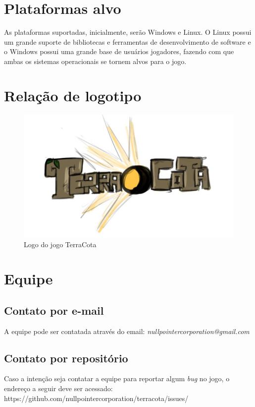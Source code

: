 \documentclass[11pt]{article}
\begin{document}
\section{Plataformas alvo}
As plataformas suportadas, inicialmente, serão Windows e Linux.
O Linux possui um grande suporte de bibliotecas e ferramentas de desenvolvimento de software e o Windows possui uma grande base de usuários jogadores, fazendo com que ambas os sistemas operacionais se tornem alvos para o jogo.

\section{Relação de logotipo}

\begin{figure}[!htp]
\centering
\includegraphics[scale=0.75]{logo-terracota.jpg}
\caption{Logo do jogo TerraCota}
\label{TerraCota logo}
\end{figure}

\section{Equipe}
\subsection{Contato por e-mail}
A equipe pode ser contatada através do email: \textit{nullpointercorporation@gmail.com}

\subsection{Contato por repositório}
Caso a intenção seja contatar a equipe para reportar algum \textit{bug} no jogo, o endereço a seguir deve ser acessado: https://github.com/nullpointercorporation/terracota/issues/
\newpage
\end{document}
